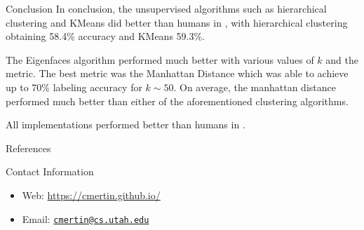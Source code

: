 \documentclass[final]{beamer}
\newlength{\onecolwid}
\begin{document}
\begin{frame}[t]
\begin{columns}[t]
\begin{column}{\onecolwid}
\begin{block}{Conclusion}
In conclusion, the unsupervised algorithms such as hierarchical clustering and KMeans did better than humans in \cite{MormonID}, with hierarchical clustering obtaining 58.4\% accuracy and KMeans 59.3\%. 

The Eigenfaces algorithm performed much better with various values of $k$ and the metric. The best metric was the Manhattan Distance which was able to achieve up to 70\% labeling accuracy for $k \sim 50$. On average, the manhattan distance performed much better than either of the aforementioned clustering algorithms.

All implementations performed better than humans in \cite{MormonID}.

\end{block}


\begin{block}{References}

\nocite{*} %
\small{
\vspace{0.75in}}

\end{block}




\begin{alertblock}{Contact Information}

\begin{itemize}
\item Web: \href{http://cmertin.github.io}{\url{https://cmertin.github.io/}}
\item Email: \href{mailto:cmertin@cs.utah.edu}{\verb~cmertin@cs.utah.edu~}
\end{itemize}

\end{alertblock}



\end{column} %

\end{columns} %

\end{frame} %
\end{document}
